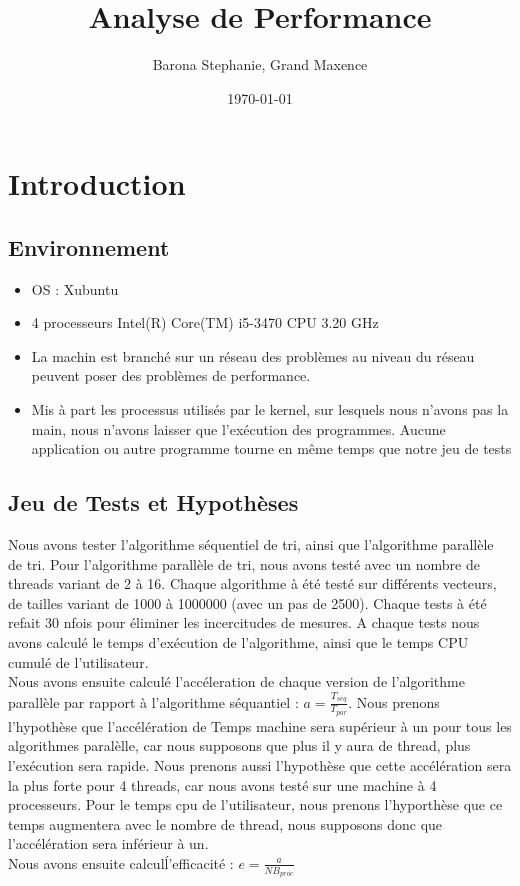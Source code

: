 \documentclass[a4paper,11pt]{scrartcl}
\title{Analyse de Performance}
\author{Barona Stephanie, Grand Maxence}
\date{\today}
\begin{document}
\maketitle

%
\section{Introduction}
\subsection{Environnement}
\begin{itemize}
\item OS : Xubuntu
\item 4 processeurs Intel(R) Core(TM) i5-3470 CPU 3.20 GHz
\item La machin est branché sur un r\'eseau des probl\`emes au niveau du r\'eseau peuvent poser des probl\`emes de performance.
\item Mis \`a part les processus utilis\'es par le kernel, sur lesquels nous n'avons pas la main, nous n'avons laisser que l'ex\'ecution des programmes. Aucune application ou autre programme tourne en m\^{e}me temps que notre jeu de tests
\end{itemize}
\subsection{Jeu de Tests et Hypoth\`eses}
Nous avons tester l'algorithme s\'equentiel de tri, ainsi que l'algorithme parall\`ele de tri. Pour l'algorithme parall\`ele de tri, nous avons test\'e avec un nombre de threads variant de 2 \`a 16. Chaque algorithme \`a \'et\'e test\'e sur diff\'erents vecteurs, de tailles variant de 1000 \`a 1000000 (avec un pas de 2500). Chaque tests \`a \'et\'e refait 30 nfois pour \'eliminer les incercitudes de mesures. A chaque tests nous avons calcul\'e le temps d'ex\'ecution de l'algorithme, ainsi que le temps CPU  cumul\'e de l'utilisateur.\\Nous avons ensuite calcul\'e l'acc\'eleration de chaque version de l'algorithme parall\`ele par rapport \`a l'algorithme s\'equantiel : $a = \frac{T_{seq}}{T_{par}} $. Nous prenons l'hypoth\`ese que l'acc\'el\'eration de Temps machine sera sup\'erieur \`a un pour tous les algorithmes paral\`elle, car nous supposons que plus il y aura de thread, plus l'ex\'ecution sera rapide. Nous prenons aussi l'hypoth\`ese que cette acc\'el\'eration sera la plus forte pour 4 threads, car nous avons test\'e sur une machine \`a 4 processeurs. Pour le temps cpu de l'utilisateur, nous prenons l'hyporth\`ese que ce temps augmentera avec le nombre de thread, nous supposons donc que l'acc\'el\'eration sera inf\'erieur \`a un.\\
Nous avons ensuite calcul\' l'efficacit\'e : $e = \frac{a}{NB_{proc}}$
\end{document}
